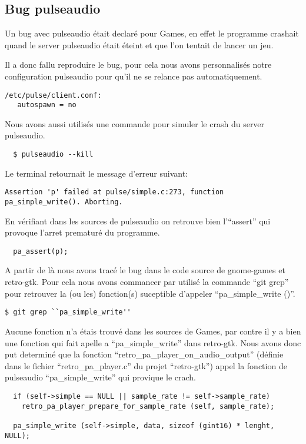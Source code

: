\documentclass[12pt]{report}
\begin{document}
\subsection{Bug pulseaudio}
Un bug avec pulseaudio était declaré pour Games, en effet le programme crashait
quand le server pulseaudio était éteint et que l'on tentait de lancer
un jeu.

Il a donc fallu reproduire le bug, pour cela nous avons personnalisés notre
configuration pulseaudio pour qu'il ne se relance pas automatiquement.
\begin{verbatim}
/etc/pulse/client.conf:
   autospawn = no
\end{verbatim}

Nous avons aussi utilisés une commande pour simuler le crash du server pulseaudio.
\begin{verbatim}
  $ pulseaudio --kill
\end{verbatim}

Le terminal retournait le message d'erreur suivant:
\begin{verbatim}
Assertion 'p' failed at pulse/simple.c:273, function pa_simple_write(). Aborting.
\end{verbatim}

En vérifiant dans les sources de pulseaudio on retrouve bien l'``assert'' qui provoque
l'arret prematuré du programme.
\begin{verbatim}
  pa_assert(p);
\end{verbatim}

A partir de là nous avons tracé le bug dans le code source de gnome-games et retro-gtk.
Pour cela nous avons commancer par utilisé la commande ``git grep'' pour retrouver
la (ou les) fonction(s) suceptible d'appeler ``pa\_simple\_write ()''.
\begin{verbatim}
$ git grep ``pa_simple_write''
\end{verbatim}

Aucune fonction n'a étais trouvé dans les sources de Games, par contre il y a bien
une fonction qui fait apelle a ``pa\_simple\_write'' dans retro-gtk.
Nous avons donc put determiné que la fonction
``retro\_pa\_player\_on\_audio\_output'' (définie dans le fichier
``retro\_pa\_player.c'' du projet ``retro-gtk'') appel la fonction de pulseaudio
``pa\_simple\_write'' qui provique le crach.
\begin{verbatim}
  if (self->simple == NULL || sample_rate != self->sample_rate)
    retro_pa_player_prepare_for_sample_rate (self, sample_rate);

  pa_simple_write (self->simple, data, sizeof (gint16) * lenght, NULL);
\end{verbatim}
\end{document}
